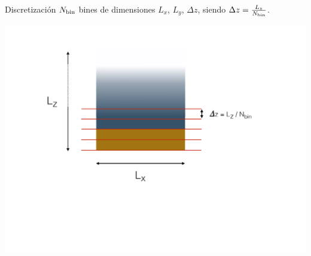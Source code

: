 \documentclass{beamer}
\begin{document}
\begin{frame}{Discretización}
  $N_{\rm bin}$ bines de dimensiones $L_x$, $L_y$, $\Delta z$, siendo $\Delta z = \frac{L_z}{N_{\rm bin}}$.
      \begin{center}
        \includegraphics[width=\linewidth]{discrete}
      \end{center}
  \end{frame}
\end{document}
